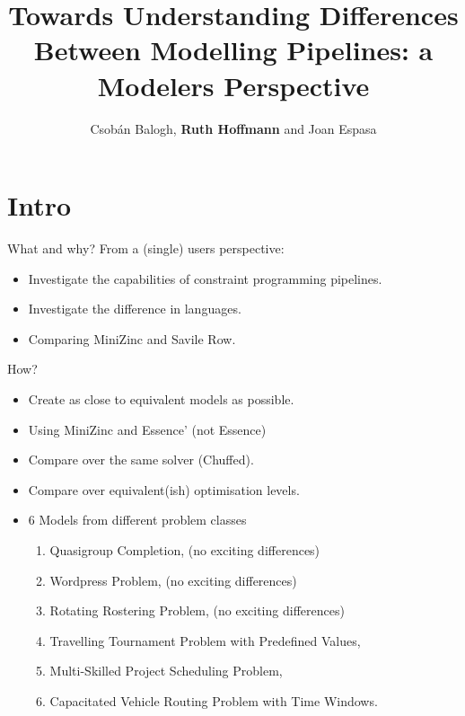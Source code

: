 \documentclass{beamer}
\title[Understanding Differences Between Modelling Pipelines]{Towards Understanding Differences Between Modelling Pipelines: a Modelers Perspective}
\author[R Hoffmann]{Csobán Balogh, \textbf{Ruth Hoffmann} and Joan Espasa}
\institute[ModRef 2024]{ModRef 2024, University of Girona}
\begin{document}
{
    \begin{frame}
        \titlepage
    \end{frame}
}


\section*{Intro}
\begin{frame}{What and why?}
From a (single) users perspective:
    \begin{itemize}
        \item Investigate the capabilities of constraint programming pipelines.
        \item Investigate the difference in languages.
        \item Comparing MiniZinc and Savile Row.
    \end{itemize}
\end{frame}

\begin{frame}{How?}
\begin{itemize}
    \item Create as close to equivalent models as possible.
    \item Using MiniZinc and Essence' (not Essence)
    \item Compare over the same solver (Chuffed).
    \item Compare over equivalent(ish) optimisation levels.
    \item 6 Models from different problem classes
    \begin{enumerate}
        \item Quasigroup Completion, (no exciting differences)
        \item Wordpress Problem, (no exciting differences)
        \item Rotating Rostering Problem, (no exciting differences)
        \item Travelling Tournament Problem with Predefined Values, 
        \item Multi-Skilled Project Scheduling Problem,
        \item Capacitated Vehicle Routing Problem with Time Windows.
    \end{enumerate}
\end{itemize}
\end{frame}
\end{document}
